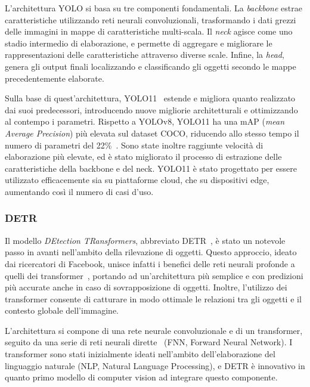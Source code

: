 \documentclass[12pt]{report}
\begin{document}
L'architettura YOLO si basa su tre componenti fondamentali. La \textit{backbone} estrae caratteristiche utilizzando reti neurali convoluzionali, trasformando i dati grezzi delle immagini in mappe di caratteristiche multi-scala. Il \textit{neck} agisce come uno stadio intermedio di elaborazione, e permette di aggregare e migliorare le rappresentazioni delle caratteristiche attraverso diverse scale. Infine, la \textit{head}, genera gli output finali localizzando e classificando gli oggetti secondo le mappe precedentemente elaborate.

Sulla base di quest'architettura, YOLO11~\cite{yolo11_ultralytics} estende e migliora quanto realizzato dai suoi predecessori, introducendo nuove migliorie architetturali e ottimizzando al contempo i parametri. Rispetto a YOLOv8, YOLO11 ha una mAP (\textit{mean Average Precision}) più elevata sul dataset COCO, riducendo allo stesso tempo il numero di parametri del 22\%~\cite{khanam2024yolov11overviewkeyarchitectural}. Sono state inoltre raggiunte velocità di elaborazione più elevate, ed è stato migliorato il processo di estrazione delle caratteristiche della backbone e del neck. YOLO11 è stato progettato per essere utilizzato efficacemente sia su piattaforme cloud, che su dispositivi edge, aumentando così il numero di casi d'uso.

\subsubsection{DETR}
\label{sec:detr}

Il modello \textit{DEtection TRansformers}, abbreviato DETR~\cite{carion2020end}, è stato un notevole passo in avanti nell'ambito della rilevazione di oggetti. Questo approccio, ideato dai ricercatori di Facebook, unisce infatti i benefici delle reti neurali profonde a quelli dei transformer~\cite{10.1145/3505244}, portando ad un'architettura più semplice e con predizioni più accurate anche in caso di sovrapposizione di oggetti. Inoltre, l'utilizzo dei transformer consente di catturare in modo ottimale le relazioni tra gli oggetti e il contesto globale dell'immagine.

L'architettura si compone di una rete neurale convoluzionale e di un transformer, seguito da una serie di reti neurali dirette~\cite{article_890416} (FNN, Forward Neural Network). I transformer sono stati inizialmente ideati nell'ambito dell'elaborazione del linguaggio naturale (NLP, Natural Language Processing), e DETR è innovativo in quanto primo modello di computer vision ad integrare questo componente.
\end{document}
